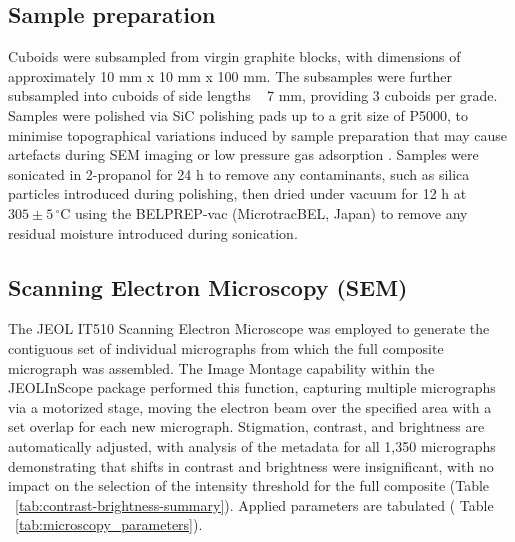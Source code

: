 \documentclass[review]{elsarticle}
\begin{document}
\subsection{Sample preparation}
Cuboids were subsampled from virgin graphite blocks, with dimensions of
approximately 10 mm x 10 mm x 100 mm. The subsamples were further subsampled into
cuboids of side lengths ~ 7 mm, providing 3 cuboids per grade. Samples were
polished via SiC polishing pads up to a grit size of P5000, to minimise
topographical variations induced by sample preparation that may cause artefacts
during SEM imaging or low pressure gas adsorption \citep{Fang2022,Jones2018}.
Samples were sonicated in 2-propanol for 24 h to remove any contaminants, such as
silica particles introduced during polishing, then dried under vacuum
for 12 h at $305 \pm 5 \,^\circ\mathrm{C}$ using the BELPREP-vac (MicrotracBEL,
Japan) to remove any residual moisture introduced during sonication.


\subsection{Scanning Electron Microscopy (SEM)}

The JEOL IT510 Scanning Electron Microscope was employed to generate the
contiguous set of individual micrographs from which the full composite
micrograph was assembled. The Image Montage capability within the JEOLInScope
package performed this function, capturing multiple micrographs via a motorized
stage, moving the electron beam over the specified area with a set overlap for
each new micrograph. Stigmation, contrast, and brightness are automatically
adjusted, with analysis of the metadata for all 1,350 micrographs demonstrating
that shifts in contrast and brightness were insignificant, with no impact on the
selection of the intensity threshold for the full composite (Table
~\ref{tab:contrast-brightness-summary}). Applied parameters are tabulated (
Table ~\ref{tab:microscopy_parameters}).
\end{document}
